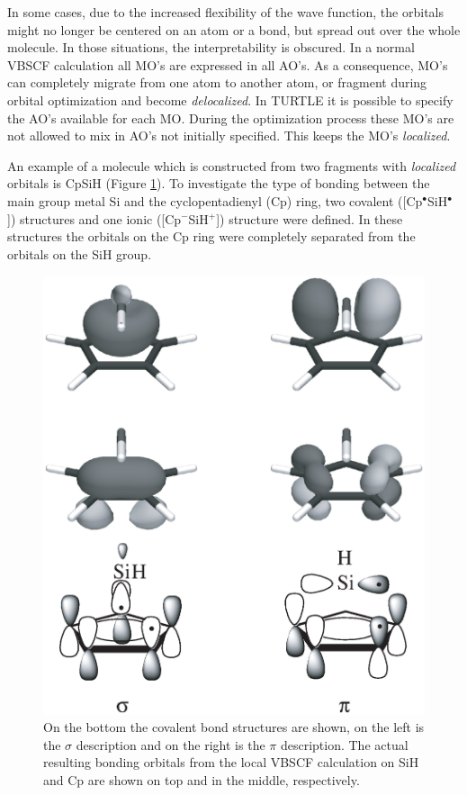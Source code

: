 In some cases, due to the increased flexibility of the wave function, the orbitals might no longer be centered on an atom or a bond, but spread out over the whole molecule. In those situations, the interpretability is obscured. In a normal VBSCF calculation all MO's are expressed in all AO's. As a consequence, MO's can completely migrate from one atom to another atom, or fragment during orbital optimization and become \textit{delocalized}. In TURTLE it is possible to specify the AO's available for each MO. During the optimization process these MO's are not allowed to mix in AO's not initially specified. This keeps the MO's \textit{localized}. 

An example of a molecule which is constructed from two fragments with \textit{localized} orbitals is CpSiH (Figure \ref{ch1.fig7}). To investigate the type of bonding between the main group metal Si and the cyclopentadienyl (Cp) ring, two covalent ([Cp$^\bullet$SiH$^\bullet$]) structures and one ionic ([Cp$^{-}$SiH$^{+}$]) structure were defined. In these structures the orbitals on the Cp ring were completely separated from the orbitals on the SiH group.
\begin{figure}[htbp]
\center
\includegraphics[scale=0.5]{introduction/figures/figure7.eps}
\caption{On the bottom the covalent bond structures are shown, on the left is the $\sigma$ description and on the right is the $\pi$ description. The actual resulting bonding orbitals from the local VBSCF calculation on SiH and Cp are shown on top and in the middle, respectively.}
\label{ch1.fig7}
\end{figure}
